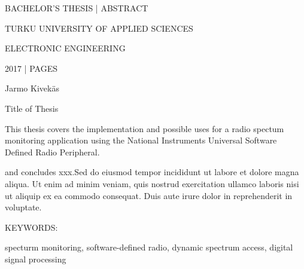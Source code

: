 BACHELOR'S THESIS | ABSTRACT

TURKU UNIVERSITY OF APPLIED SCIENCES

ELECTRONIC ENGINEERING

2017 | \pageref{LastPage} PAGES


\vspace{10mm}
{\Large Jarmo Kivekäs \par}

\vspace{10mm}
{\huge Title of Thesis \par}

\vspace{10mm}

This thesis covers the implementation and possible uses for a radio spectum monitoring
application using the National Instruments Universal Software Defined Radio Peripheral.

and concludes xxx.Sed do eiusmod tempor
incididunt ut labore et dolore magna aliqua. Ut enim ad minim veniam,
quis nostrud exercitation ullamco laboris nisi ut aliquip ex ea commodo
consequat. Duis aute irure dolor in reprehenderit in voluptate.

\vspace{30mm}

KEYWORDS:

specturm monitoring, software-defined radio, dynamic spectrum access, digital signal processing
